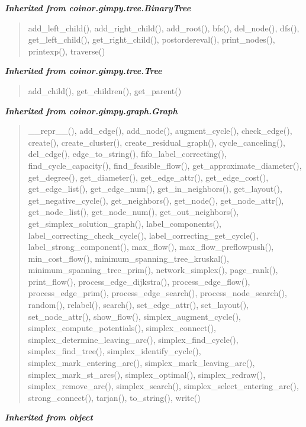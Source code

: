 \large{\textbf{\textit{Inherited from coinor.gimpy.tree.BinaryTree}}}

\begin{quote}
add\_left\_child(), add\_right\_child(), add\_root(), bfs(), del\_node(), dfs(), get\_left\_child(), get\_right\_child(), postordereval(), print\_nodes(), printexp(), traverse()
\end{quote}

\large{\textbf{\textit{Inherited from coinor.gimpy.tree.Tree}}}

\begin{quote}
add\_child(), get\_children(), get\_parent()
\end{quote}

\large{\textbf{\textit{Inherited from coinor.gimpy.graph.Graph}}}

\begin{quote}
\_\_repr\_\_(), add\_edge(), add\_node(), augment\_cycle(), check\_edge(), create(), create\_cluster(), create\_residual\_graph(), cycle\_canceling(), del\_edge(), edge\_to\_string(), fifo\_label\_correcting(), find\_cycle\_capacity(), find\_feasible\_flow(), get\_approximate\_diameter(), get\_degree(), get\_diameter(), get\_edge\_attr(), get\_edge\_cost(), get\_edge\_list(), get\_edge\_num(), get\_in\_neighbors(), get\_layout(), get\_negative\_cycle(), get\_neighbors(), get\_node(), get\_node\_attr(), get\_node\_list(), get\_node\_num(), get\_out\_neighbors(), get\_simplex\_solution\_graph(), label\_components(), label\_correcting\_check\_cycle(), label\_correcting\_get\_cycle(), label\_strong\_component(), max\_flow(), max\_flow\_preflowpush(), min\_cost\_flow(), minimum\_spanning\_tree\_kruskal(), minimum\_spanning\_tree\_prim(), network\_simplex(), page\_rank(), print\_flow(), process\_edge\_dijkstra(), process\_edge\_flow(), process\_edge\_prim(), process\_edge\_search(), process\_node\_search(), random(), relabel(), search(), set\_edge\_attr(), set\_layout(), set\_node\_attr(), show\_flow(), simplex\_augment\_cycle(), simplex\_compute\_potentials(), simplex\_connect(), simplex\_determine\_leaving\_arc(), simplex\_find\_cycle(), simplex\_find\_tree(), simplex\_identify\_cycle(), simplex\_mark\_entering\_arc(), simplex\_mark\_leaving\_arc(), simplex\_mark\_st\_arcs(), simplex\_optimal(), simplex\_redraw(), simplex\_remove\_arc(), simplex\_search(), simplex\_select\_entering\_arc(), strong\_connect(), tarjan(), to\_string(), write()
\end{quote}

\large{\textbf{\textit{Inherited from object}}}

